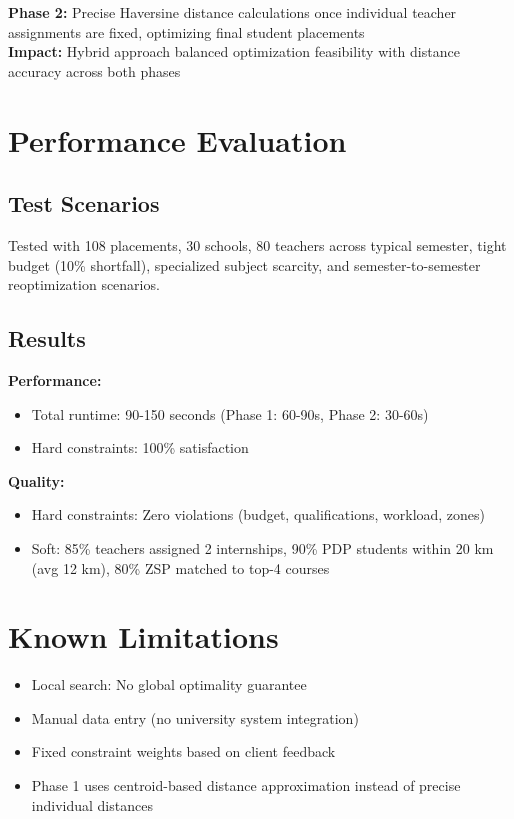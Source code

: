 \documentclass[12pt,a4paper]{report}
\begin{document}
\textbf{Phase 2:} Precise Haversine distance calculations once individual teacher assignments are fixed, optimizing final student placements
\\
\textbf{Impact:} Hybrid approach balanced optimization feasibility with distance accuracy across both phases

\section{Performance Evaluation}

\subsection{Test Scenarios}

Tested with 108 placements, 30 schools, 80 teachers across typical semester, tight budget (10\% shortfall), specialized subject scarcity, and semester-to-semester reoptimization scenarios.

\subsection{Results}

\textbf{Performance:}
\begin{itemize}
    \item Total runtime: 90-150 seconds (Phase 1: 60-90s, Phase 2: 30-60s)
    \item Hard constraints: 100\% satisfaction
\end{itemize}

\textbf{Quality:}
\begin{itemize}
    \item Hard constraints: Zero violations (budget, qualifications, workload, zones)
    \item Soft: 85\% teachers assigned 2 internships, 90\% PDP students within 20 km (avg 12 km), 80\% ZSP matched to top-4 courses
\end{itemize}

\section{Known Limitations}

\begin{itemize}
    \item Local search: No global optimality guarantee
    \item Manual data entry (no university system integration)
    \item Fixed constraint weights based on client feedback
    \item Phase 1 uses centroid-based distance approximation instead of precise individual distances
\end{itemize}
\end{document}
